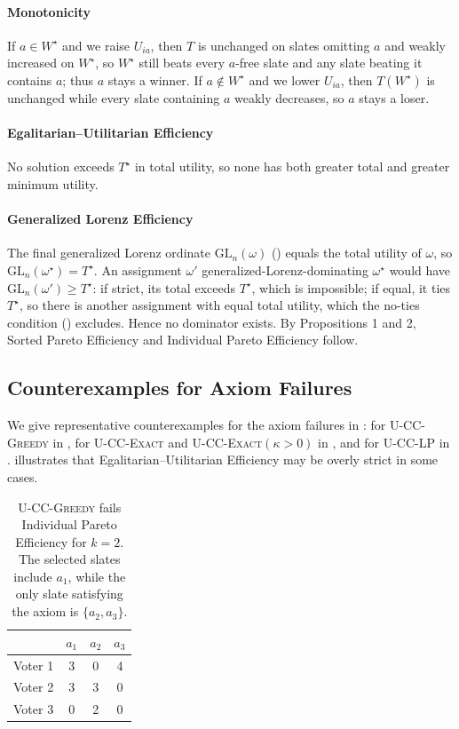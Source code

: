 \documentclass[letterpaper]{article} %
\newcommand{\Exact}{\textsc{U-CC-Exact}}
\newcommand{\ExactP}{\textsc{U-CC-Exact}$(\kappa>0)$}
\newcommand{\Greedy}{\textsc{U-CC-Greedy}}
\newcommand{\LP}{\textsc{U-CC-LP}}
\begin{document}
\paragraph{Monotonicity} If $a\in W^\star$ and we raise $U_{ia}$, then $T$ is unchanged on slates omitting $a$ and weakly increased on $W^\star$, so $W^\star$ still beats every $a$-free slate and any slate beating it contains $a$; thus $a$ stays a winner.
If $a\notin W^\star$ and we lower $U_{ia}$, then $T(W^\star)$ is unchanged while every slate containing $a$ weakly decreases, so $a$ stays a loser.

\paragraph{Egalitarian--Utilitarian Efficiency} No solution exceeds $T^\star$ in total utility, so none has both greater total and greater minimum utility.

\paragraph{Generalized Lorenz Efficiency} The final generalized Lorenz ordinate $\mathrm{GL}_n(\omega)$ () equals the total utility of $\omega$, so $\mathrm{GL}_n(\omega^\star)=T^\star$.
An assignment $\omega'$ generalized-Lorenz-dominating $\omega^\star$ would have $\mathrm{GL}_n(\omega')\ge T^\star$: if strict, its total exceeds $T^\star$, which is impossible; if equal, it ties $T^\star$, so there is another assignment with equal total utility, which the no-ties condition () excludes.
Hence no dominator exists.
By Propositions 1 and 2, Sorted Pareto Efficiency and Individual Pareto Efficiency follow.

\subsection{Counterexamples for Axiom Failures}
\label{app:voting-failures}

We give representative counterexamples for the axiom failures in : for \Greedy{} in , for \Exact{} and \ExactP{} in , and for \LP{} in .
 illustrates that Egalitarian--Utilitarian Efficiency may be overly strict in some cases.

\begin{table}[t]
\centering
\begin{tabular}{l|ccc}
\hline
 & $a_1$ & $a_2$ & $a_3$ \\
\hline
Voter 1 & 3 & 0 & 4 \\
Voter 2 & 3 & 3 & 0 \\
Voter 3 & 0 & 2 & 0 \\
\hline
\end{tabular}
\caption{\Greedy{} fails Individual Pareto Efficiency for $k=2$.
The selected slates include \(a_1\), while the only slate satisfying the axiom is \(\{a_2,a_3\}\).}
\label{tab:failure-greedy-indiv-pareto}
\end{table}
\end{document}
